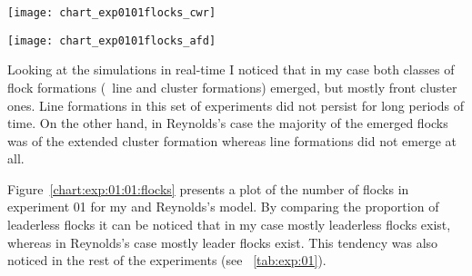 \begin{figure*}[!t]
	\null\vspace*{2mm}
	\texttt{[image: chart\_exp0101flocks\_cwr]}
	\par\vspace*{2mm}
	\texttt{[image: chart\_exp0101flocks\_afd]}
	\par\vspace*{2mm}
	\caption{Plot of the number of flocks (blue line) and the contribution of leaderless flocks (orange line) for one of the eight experiments used to estimate the flocking ability of Reynolds's model \cite{reynolds:1999} (top chart) and my fuzzy model (bottom chart). Note that because in Reynolds's case the area of potential influence is larger, the number of flocks is lower to begin with, so the values cannot be directly compared. However, since the number of flocks in both cases decreases through time it can be concluded that the two models present flocking ability. Beside this, it can also be noticed that the fuzzy model produces mostly leaderless flocks whereas Reynolds's model mostly leader flocks.}
	\label{chart:exp:01:01:flocks}
\end{figure*}

Looking at the simulations in real-time I noticed that in my case both classes of flock formations (\ie\ line and cluster formations) emerged, but mostly front cluster ones. Line formations in this set of experiments did not persist for long periods of time. On the other hand, in Reynolds's case the majority of the emerged flocks was of the extended cluster formation whereas line formations did not emerge at all. 

Figure~\ref{chart:exp:01:01:flocks} presents a plot of the number of flocks in experiment 01 for my and Reynolds's model. By comparing the proportion of leaderless flocks it can be noticed that in my case mostly leaderless flocks exist, whereas in Reynolds's case mostly leader flocks exist. This tendency was also noticed in the rest of the experiments (see \tab~\ref{tab:exp:01}). 

